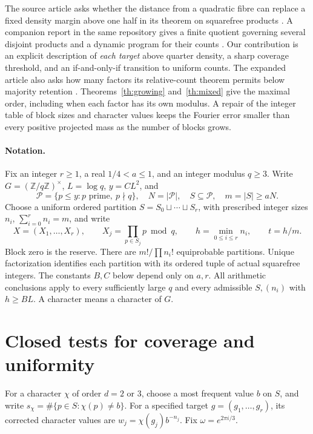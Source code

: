 \documentclass[11pt,letterpaper]{article}
\newcommand{\Pp}{\mathcal P}
\newcommand{\abs}[1]{\lvert#1\rvert}
\begin{document}
The source article asks whether the distance from a quadratic fibre can replace a fixed density margin above one half in its theorem on squarefree products \cite{article}. A companion report in the same repository gives a finite quotient governing several disjoint products and a dynamic program for their counts \cite{factor}. Our contribution is an explicit description of \emph{each target} above quarter density, a sharp coverage threshold, and an if-and-only-if transition to uniform counts. The expanded article also asks how many factors its relative-count theorem permits below majority retention \cite{merged}. Theorems~\ref{th:growing} and~\ref{th:mixed} give the maximal order, including when each factor has its own modulus. A repair of the integer table of block sizes and character values keeps the Fourier error smaller than every positive projected mass as the number of blocks grows.

\paragraph{Notation.}
Fix an integer \(r\ge1\), a real \(1/4<a\le1\), and an integer modulus \(q\ge3\).
Write \(G=(\mathbb Z/q\mathbb Z)^\times\), \(L=\log q\), \(y=CL^2\), and
\[
 \Pp=\{p\le y:p\text{ prime},\ p\nmid q\},\quad N=\abs{\Pp},
 \quad S\subseteq\Pp,\quad m=\abs S\ge aN .
\]
Choose a uniform ordered partition \(S=S_0\sqcup\cdots\sqcup S_r\), with prescribed integer sizes \(n_i\), \(\sum_{i=0}^r n_i=m\), and write
\[
 X=(X_1,\ldots,X_r),\qquad X_j=\prod_{p\in S_j}p\bmod q,\qquad
 h=\min_{0\le i\le r} n_i,\qquad t=h/m.
\]
Block zero is the reserve. There are \(m!/\prod n_i!\) equiprobable partitions. Unique factorization identifies each partition with its ordered tuple of actual squarefree integers. The constants \(B,C\) below depend only on \(a,r\). All arithmetic conclusions apply to every sufficiently large \(q\) and every admissible \(S,(n_i)\) with \(h\ge B L\). A character means a character of \(G\).

\section{Closed tests for coverage and uniformity}
For a character \(\chi\) of order \(d=2\) or \(3\), choose a most frequent value \(b\) on \(S\), and write \(s_\chi=\#\{p\in S:\chi(p)\ne b\}\). For a specified target \(g=(g_1,\dots,g_r)\), its corrected character values are \(w_j=\chi(g_j)b^{-n_j}\). Fix \(\omega=e^{2\pi i/3}\).
\end{document}

